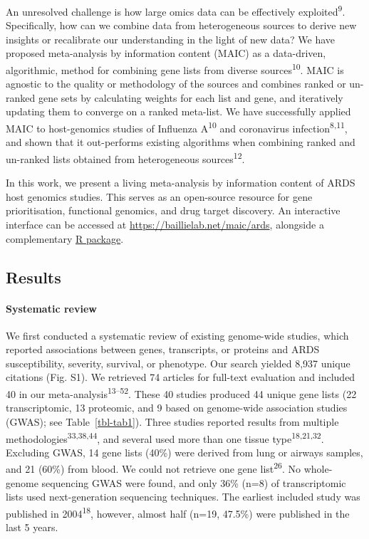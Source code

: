 \documentclass[
  11,
  a4paper,
]{article}
\let\oldparagraph\paragraph
\renewcommand{\paragraph}[1]{\oldparagraph{#1}\mbox{}}
\begin{document}
An unresolved challenge is how large omics data can be effectively
exploited\textsuperscript{9}. Specifically, how can we combine data from
heterogeneous sources to derive new insights or recalibrate our
understanding in the light of new data? We have proposed meta-analysis
by information content (MAIC) as a data-driven, algorithmic, method for
combining gene lists from diverse sources\textsuperscript{10}. MAIC is
agnostic to the quality or methodology of the sources and combines
ranked or un-ranked gene sets by calculating weights for each list and
gene, and iteratively updating them to converge on a ranked meta-list.
We have successfully applied MAIC to host-genomics studies of Influenza
A\textsuperscript{10} and coronavirus infection\textsuperscript{8,11},
and shown that it out-performs existing algorithms when combining ranked
and un-ranked lists obtained from heterogeneous
sources\textsuperscript{12}.

In this work, we present a living meta-analysis by information content
of ARDS host genomics studies. This serves as an open-source resource
for gene prioritisation, functional genomics, and drug target discovery.
An interactive interface can be accessed at
\url{https://baillielab.net/maic/ards}, alongside a complementary
\href{https://github.com/baillielab/ARDSMAICr}{R package}.

\newpage

\subsection{Results}\label{results}

\paragraph{Systematic review}\label{systematic-review}

We first conducted a systematic review of existing genome-wide studies,
which reported associations between genes, transcripts, or proteins and
ARDS susceptibility, severity, survival, or phenotype. Our search
yielded 8,937 unique citations (Fig. S1). We retrieved 74 articles for
full-text evaluation and included 40 in our
meta-analysis\textsuperscript{13--52}. These 40 studies produced 44
unique gene lists (22 transcriptomic, 13 proteomic, and 9 based on
genome-wide association studies (GWAS); see Table~\ref{tbl-tab1}). Three
studies reported results from multiple
methodologies\textsuperscript{33,38,44}, and several used more than one
tissue type\textsuperscript{18,21,32}. Excluding GWAS, 14 gene lists
(40\%) were derived from lung or airways samples, and 21 (60\%) from
blood. We could not retrieve one gene list\textsuperscript{26}. No
whole-genome sequencing GWAS were found, and only 36\% (n=8) of
transcriptomic lists used next-generation sequencing techniques. The
earliest included study was published in 2004\textsuperscript{18},
however, almost half (n=19, 47.5\%) were published in the last 5 years.
\end{document}
